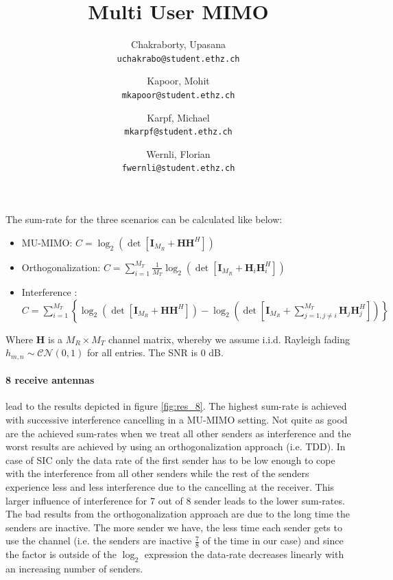 \documentclass[10pt,a4paper]{article}
\author{
  Chakraborty, Upasana \\
  \texttt{uchakrabo@student.ethz.ch}
  \and
  Kapoor, Mohit \\
  \texttt{mkapoor@student.ethz.ch}
  \and
  Karpf, Michael \\
  \texttt{mkarpf@student.ethz.ch}
  \and
  Wernli, Florian \\
  \texttt{fwernli@student.ethz.ch}
}
\title{Multi User MIMO}
\begin{document}
\maketitle
	
\noindent The sum-rate for the three scenarios can be calculated like below:
	\begin{itemize}
		\item MU-MIMO: $C=\log_2\left(\det\left[\textbf{I}_{M_R}+\textbf{H}\textbf{H}^H\right]\right)$
		\item Orthogonalization: $C=\sum_{i=1}^{M_T}\frac{1}{M_T}\log_2\left(\det\left[\textbf{I}_{M_R}+\textbf{H}_i\textbf{H}_i^H\right]\right)$
		\item Interference \cite{bib:interference}: $C=\sum_{i=1}^{M_T}\left\{\log_2\left(\det\left[\textbf{I}_{M_R}+\textbf{H}\textbf{H}^H\right]\right)-\log_2\left(\det\left[\textbf{I}_{M_R}+\sum_{j=1,j\ne i}^{M_T}\textbf{H}_j\textbf{H}_j^H\right]\right)\right\}$
                \end{itemize}      
                Where $\textbf{H}$ is a $M_R\times M_T$ channel matrix, whereby we assume i.i.d. Rayleigh fading $h_{m,n}\sim\mathcal{CN}(0,1)$ for all entries. The SNR is 0 dB.
	\paragraph{8 receive antennas} lead to the results depicted in figure \ref{fig:res_8}. The highest sum-rate is achieved with successive interference cancelling in a MU-MIMO setting. Not quite as good are the achieved sum-rates when we treat all other senders as interference and the worst results are achieved by using an orthogonalization approach (i.e. TDD). In case of SIC only the data rate of the first sender has to be low enough to cope with the interference from all other senders while the rest of the senders experience less and less interference due to the cancelling at the receiver. This larger influence of interference for 7 out of 8 sender leads to the lower sum-rates. The bad results from the orthogonalization approach are due to the long time the senders are inactive. The more sender we have, the less time each sender gets to use the channel (i.e. the senders are inactive $\frac{7}{8}$ of the time in our case) and since the factor is outside of the $\log_2$ expression the data-rate decreases linearly with an increasing number of senders. 
	
\end{document}
